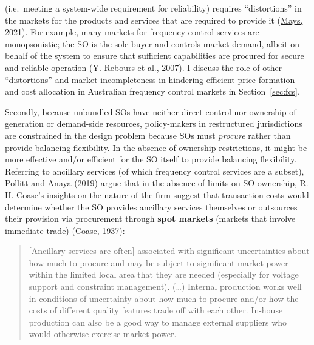 \documentclass[12pt,a4paper,]{report}
\begin{document}
(i.e.~meeting a system-wide requirement for reliability) requires
``distortions'' in the markets for the products and services that are
required to provide it
(\protect\hyperlink{ref-maysMissingIncentivesFlexibility2021}{Mays,
2021}). For example, many markets for frequency control services are
monopsonistic; the SO is the sole buyer and controls market demand,
albeit on behalf of the system to ensure that sufficient capabilities
are procured for secure and reliable operation
(\protect\hyperlink{ref-reboursFundamentalDesignIssues2007}{Y. Rebours
et al., 2007}). I discuss the role of other ``distortions'' and market
incompleteness in hindering efficient price formation and cost
allocation in Australian frequency control markets in
Section~\ref{sec:fcs}.

Secondly, because unbundled SOs have neither direct control nor
ownership of generation or demand-side resources, policy-makers in
restructured jurisdictions are constrained in the design problem because
SOs must \emph{procure} rather than provide balancing flexibility. In
the absence of ownership restrictions, it might be more effective and/or
efficient for the SO itself to provide balancing flexibility. Referring
to ancillary services (of which frequency control services are a
subset), Pollitt and Anaya
(\protect\hyperlink{ref-pollittCompetitionMarketsAncillary2019}{2019})
argue that in the absence of limits on SO ownership, R. H. Coase's
insights on the nature of the firm suggest that transaction costs would
determine whether the SO provides ancillary services themselves or
outsources their provision via procurement through \textbf{spot markets}
(markets that involve immediate trade)
(\protect\hyperlink{ref-coaseNatureFirm1937}{Coase, 1937}):

\begin{quote}
{[}Ancillary services are often{]} associated with significant
uncertainties about how much to procure and may be subject to
significant market power within the limited local area that they are
needed (especially for voltage support and constraint management).
(\ldots) Internal production works well in conditions of uncertainty
about how much to procure and/or how the costs of different quality
features trade off with each other. In-house production can also be a
good way to manage external suppliers who would otherwise exercise
market power.
\end{quote}
\end{document}
